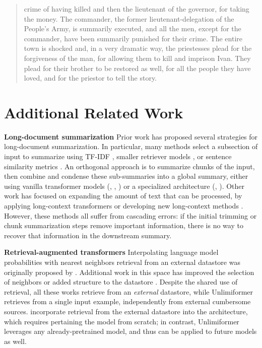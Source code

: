 \documentclass{article}
\newcommand{\ours}{Unlimiformer\xspace}
\begin{document}
\begin{quote}
crime of having killed and then the lieutenant of the governor, for taking the money. The commander, the former lieutenant-delegation of the People's Army, is summarily executed, and all the men, except for the commander, have been summarily punished for their crime. The entire town is shocked and, in a very dramatic way, the priestesses plead for the forgiveness of the man, for allowing them to kill and imprison Ivan. They plead for their brother to be restored as well, for all the people they have loved, and for the priestor to tell the story.

\end{quote}

\section{Additional Related Work}
\label{app:related}
\textbf{Long-document summarization} Prior work has proposed several strategies for long-document summarization. In particular, many methods select a subsection of input to summarize using TF-IDF \citep{wikisum}, smaller retriever models \citep{liu-lapata-2019-hierarchical}, or sentence similarity metrics \citep{bajaj-etal-2021-long}. 
An orthogonal approach is to summarize chunks of the input, then combine and condense these sub-summaries into a global summary, either using vanilla transformer models (\citet{booksum}, \citet{zhang-etal-2022-summn}, \citep{zhang-etal-2021-leveraging-pretrained}) or a specialized architecture (\citet{liu-lapata-2019-hierarchical}, \citet{grail-etal-2021-globalizing}).
Other work has focused on expanding the amount of text that can be processed, by applying long-context transformers or developing new long-context methods \citep{huang-etal-2021-efficient}.
However, these methods all suffer from cascading errors: if the initial trimming or chunk summarization steps remove important information, there is no way to recover that information in the downstream summary. 

\textbf{Retrieval-augmented transformers} Interpolating language model probabilities with nearest neighbors retrieval from an external datastore was originally proposed by \citet{knnlm}. %
Additional work in this space has improved the selection of neighbors \citep{drozdov-etal-2022-cant} or added structure to the datastore \citep{retomaton}. Despite the shared use of retrieval, all these works retrieve from an \emph{external} datastore, while \ours retrieves from a single input example, independently from external cumbersome sources.
\citet{borgeaud2022improving} incorporate retrieval from the external datastore into the architecture, which requires pertaining the model from scratch; in contrast, \ours leverages any already-pretrained model, and thus can be applied to future models as well.



\end{document}
